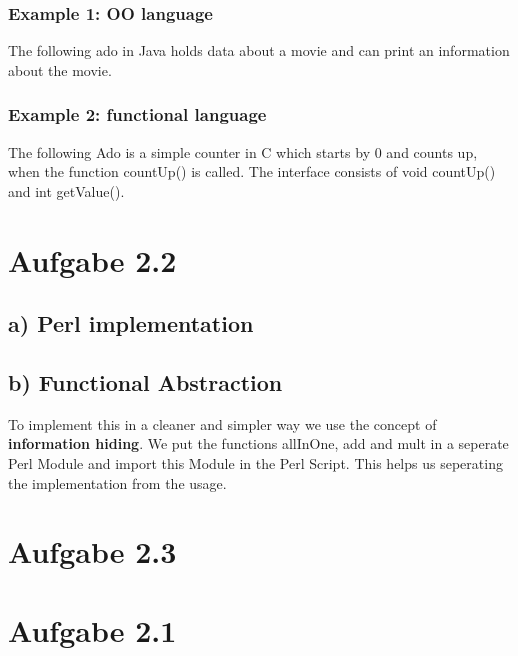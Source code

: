 \documentclass[a4paper,10pt]{scrartcl}[2003/01/01]
\begin{document}
    \subsubsection*{Example 1: OO language}
    The following ado in Java holds data about a movie and can print an information about the movie. 
    
    
    \subsubsection*{Example 2: functional language}
    The following Ado is a simple counter in C which starts by 0 and counts up, when the function countUp() is called. The interface consists of void countUp() and int getValue().
    
    
    
    \section*{Aufgabe 2.2}
    \subsection*{a) Perl implementation}
    
    \subsection*{b) Functional Abstraction}
    To implement this in a cleaner and simpler way we use the concept of \textbf{information hiding}. We put the functions allInOne, add and mult in a seperate Perl Module and import this Module in the Perl Script. This helps us seperating the implementation from the usage.
    
    
    
    
    
    \section*{Aufgabe 2.3}


	\maketitle
	
	\section*{Aufgabe 2.1}
\end{document}
